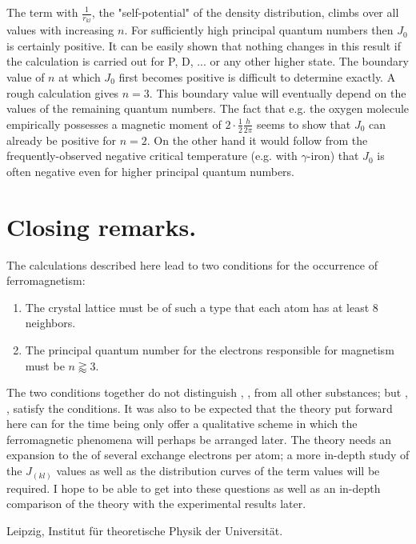 \begin{paper}{1}
The term with $\frac{1}{r_{kl}}$, the "self-potential" of the density distribution, climbs over all values with increasing $n$. For sufficiently high principal quantum numbers then $J_0$ is certainly positive. It can be easily shown that nothing changes in this result if the calculation is carried out for P, D, ... or any other higher state.  The boundary value of $n$ at which $J_0$ first becomes positive is difficult to determine exactly. A rough calculation gives $n=3$. This boundary value will eventually depend on the values of the remaining quantum numbers. The fact that e.g. the oxygen molecule empirically possesses a magnetic moment of $2\cdot\frac{1}{2}\frac{h}{2\pi}$ seems to show that $J_0$ can already be positive for $n=2$. On the other hand   it would follow from the frequently-observed negative critical temperature (e.g. with $\gamma$-iron) that $J_0$ is often negative even for higher principal quantum numbers.

\section*{Closing remarks.} The  calculations described here lead to two conditions for the occurrence of ferromagnetism:

\begin{enumerate}
	\item The crystal lattice must be of such a type that each atom has at least 8 neighbors.
	\item The principal quantum number for the electrons responsible for magnetism must be $n\gtrapprox 3$.
\end{enumerate}

The two conditions together do not distinguish , ,  from all other substances; but , ,  satisfy the conditions. It was also to be expected that the theory put forward here can for the time being only offer a qualitative scheme in which the ferromagnetic phenomena will perhaps be arranged later. The theory needs an expansion to the of several exchange electrons per atom; a more in-depth study of the $J_{(kl)}$ values as well as the distribution curves of the term values will be required. I hope to be able to get into these questions as well as an in-depth comparison of the theory with the experimental results later.

Leipzig, Institut f\"ur theoretische Physik der Universit\"at.
\end{paper}